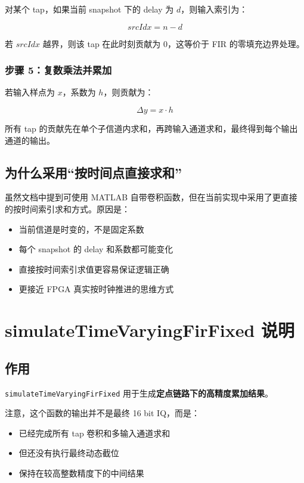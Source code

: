 \documentclass[12pt,a4paper]{article}
\begin{document}
对某个 tap，如果当前 snapshot 下的 delay 为 $d$，则输入索引为：

\begin{equation}
srcIdx = n - d
\end{equation}

若 $srcIdx$ 越界，则该 tap 在此时刻贡献为 0，这等价于 FIR 的零填充边界处理。

\subsubsection{步骤 5：复数乘法并累加}

若输入样点为 $x$，系数为 $h$，则贡献为：

\begin{equation}
\Delta y = x \cdot h
\end{equation}

所有 tap 的贡献先在单个子信道内求和，再跨输入通道求和，最终得到每个输出通道的输出。

\subsection{为什么采用“按时间点直接求和”}

虽然文档中提到可使用 MATLAB 自带卷积函数，但在当前实现中采用了更直接的按时间索引求和方式。原因是：

\begin{itemize}
\item 当前信道是时变的，不是固定系数
\item 每个 snapshot 的 delay 和系数都可能变化
\item 直接按时间索引求值更容易保证逻辑正确
\item 更接近 FPGA 真实按时钟推进的思维方式
\end{itemize}

\section{simulateTimeVaryingFirFixed 说明}

\subsection{作用}

\texttt{simulateTimeVaryingFirFixed} 用于生成\textbf{定点链路下的高精度累加结果}。

注意，这个函数的输出并不是最终 16 bit IQ，而是：

\begin{itemize}
\item 已经完成所有 tap 卷积和多输入通道求和
\item 但还没有执行最终动态截位
\item 保持在较高整数精度下的中间结果
\end{itemize}
\end{document}

